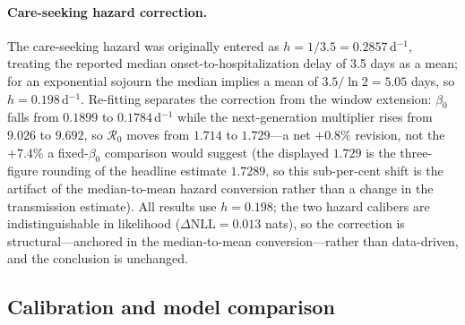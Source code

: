\documentclass[preprint,12pt,numbers]{elsarticle}
\newcommand{\Reff}{\mathcal{R}}
\begin{document}
\paragraph{Care-seeking hazard correction.}
The care-seeking hazard was originally entered as $h=1/3.5=0.2857\,$d$^{-1}$,
treating the reported median onset-to-hospitalization delay of 3.5 days
as a mean; for an exponential sojourn the median implies a mean of
$3.5/\ln 2=5.05$ days, so $h=0.198\,$d$^{-1}$. Re-fitting separates the
correction from the window extension: $\beta_0$ falls from $0.1899$ to
$0.1784\,$d$^{-1}$ while the next-generation multiplier rises from
$9.026$ to $9.692$, so $\Reff_0$ moves from $1.714$ to
$1.729$---a net $+0.8\%$ revision, not the $+7.4\%$ a fixed-$\beta_0$
comparison would suggest (the displayed $1.729$ is the three-figure
rounding of the headline estimate $1.7289$, so this sub-per-cent shift is
the artifact of the median-to-mean hazard conversion rather than a change
in the transmission estimate). All results use $h=0.198$; the two hazard
calibers are indistinguishable in likelihood ($\Delta\mathrm{NLL}=0.013$ nats), so the correction is structural---anchored in the median-to-mean conversion---rather than data-driven, and the conclusion is unchanged.
\subsection{Calibration and model comparison}\label{sec:estimation}
\end{document}
